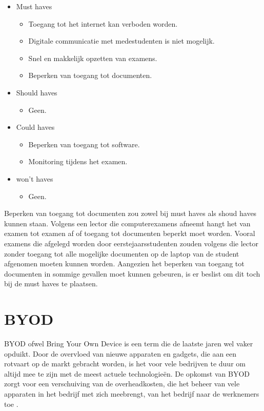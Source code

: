 	\begin{itemize}
	\item Must haves
		\begin{itemize}
		\item Toegang tot het internet kan verboden worden.
		\item Digitale communicatie met medestudenten is niet mogelijk.
		\item Snel en makkelijk opzetten van examens. 
		\item Beperken van toegang tot documenten.
		
	\end{itemize}	
	\item Should haves
		\begin{itemize}
		\item Geen.
	
		
	\end{itemize}	
	\item Could haves
		\begin{itemize}
		\item Beperken van toegang tot software.
		\item Monitoring tijdens het examen.
		
	\end{itemize}	
	\item won't haves
		\begin{itemize}
		\item Geen.
		
	\end{itemize}	
	\end{itemize}	

Beperken van toegang tot documenten zou zowel bij must haves als shoud haves kunnen staan. Volgens een lector die computerexamens afneemt hangt het van examen tot examen af of toegang tot documenten beperkt moet worden. Vooral examens die afgelegd worden door eerstejaarsstudenten zouden volgens die lector zonder toegang tot alle mogelijke documenten op de laptop van de student afgenomen moeten kunnen worden. Aangezien het beperken van toegang tot documenten in sommige gevallen moet kunnen gebeuren, is er beslist om dit toch bij de must haves te plaatsen. 



\section{BYOD}

BYOD ofwel Bring Your Own Device is een term die de laatste jaren wel vaker opduikt. Door de overvloed van nieuwe apparaten en gadgets, die aan een rotvaart op de markt gebracht worden, is het voor vele bedrijven te duur om altijd mee te zijn met de meest actuele technologieën. De opkomst van BYOD zorgt voor een verschuiving van de overheadkosten, die het beheer van vele apparaten in het bedrijf met zich meebrengt, van het bedrijf naar de werknemers toe \autocite{Hong2016}.

